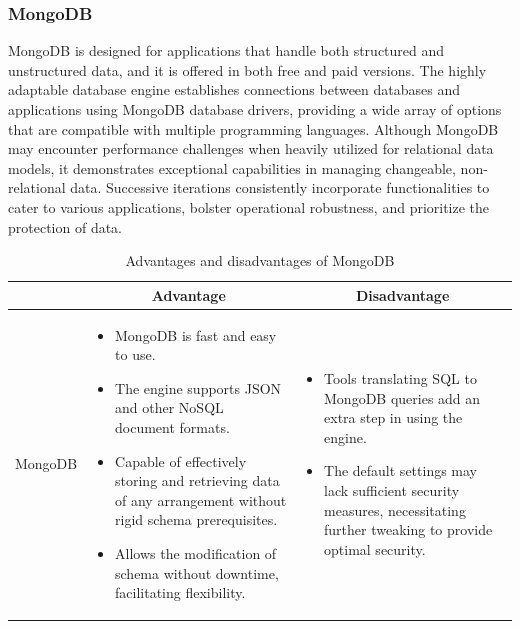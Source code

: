 \subsubsection{MongoDB}

MongoDB is designed for applications that handle both structured and unstructured data, and it is offered in both free and paid versions. The highly adaptable database engine establishes connections between databases and applications using MongoDB database drivers, providing a wide array of options that are compatible with multiple programming languages. Although MongoDB may encounter performance challenges when heavily utilized for relational data models, it demonstrates exceptional capabilities in managing changeable, non-relational data. Successive iterations consistently incorporate functionalities to cater to various applications, bolster operational robustness, and prioritize the protection of data.

\begin{table}[H]
    \centering
    \begin{tabular}{| c | p{} | p{} |}
        \hline
        \multicolumn{1}{|c|}{}
        & \multicolumn{1}{c|}{Advantage}
        & \multicolumn{1}{c|}{Disadvantage} \\ \hline
        \multirow{7}{*}{MongoDB}     
                &   \begin{itemize}[leftmargin=*,topsep=0pt,partopsep=0pt,parsep=0pt]
                        \item MongoDB is fast and easy to use.
                        \item The engine supports JSON and other NoSQL document formats.
                        \item Capable of effectively storing and retrieving data of any arrangement without rigid schema prerequisites.
                        \item  Allows the modification of schema without downtime, facilitating flexibility.
                    \end{itemize}
                &   \begin{itemize}[leftmargin=*,topsep=0pt,partopsep=0pt,parsep=0pt]
                        \item Tools translating SQL to MongoDB queries add an extra step in using the engine.
                        \item The default settings may lack sufficient security measures, necessitating further tweaking to provide optimal security.
                    \end{itemize} \\ \hline
    \end{tabular}
    \caption{Advantages and disadvantages of MongoDB}
\end{table}


